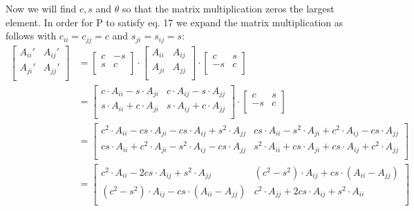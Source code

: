 \documentclass[12pt,twoside]{article}
\begin{document}
Now we will find $c, s$ and $\theta$ so that the matrix multiplication zeros the largest element. In order for P to satisfy eq. 17 we expand the matrix multiplication as follows with $c_{ii}=c_{jj}=c$ and $s_{ji}=s_{ij}=s$:\\
\begin{equation}
\begin{split}
\begin{bmatrix}
     A_{ii}' & A_{ij}' \\
    A_{ji}' & A_{jj}' \\
\end{bmatrix}
 &=
\begin{bmatrix}
     c & -s \\
    s & c \\
\end{bmatrix}
\cdot
\begin{bmatrix}
     A_{ii} & A_{ij} \\
    A_{ji} & A_{jj} \\
\end{bmatrix}
\cdot
\begin{bmatrix}
     c & s \\
     -s & c \\
\end{bmatrix}\\
&=\begin{bmatrix}
     c\cdot A_{ii} - s\cdot A_{ji} & c\cdot A_{ij} - s\cdot A_{jj} \\
     s\cdot A_{ii} + c\cdot A_{ji} & s\cdot A_{ij} + c\cdot A_{jj} \\
\end{bmatrix}
\cdot
\begin{bmatrix}
     c & s \\
     -s & c \\
\end{bmatrix}\\
&=\begin{bmatrix}
c^2\cdot A_{ii} - cs\cdot A_{ji} - cs\cdot A_{ij} + s^2\cdot A_{jj} & cs\cdot A_{ii} - s^2\cdot A_{ji} + c^2\cdot A_{ij} - cs\cdot A_{jj}\\
cs\cdot A_{ii} + c^2\cdot A_{ji} - s^2\cdot A_{ij} - cs\cdot A_{jj} & s^2\cdot A_{ii} + cs\cdot A_{ji} + cs\cdot A_{ij} + c^2\cdot A_{jj}\\
\end{bmatrix}\\
&=\begin{bmatrix}
c^2\cdot A_{ii} - 2cs\cdot A_{ij}  + s^2\cdot A_{jj} & (c^2-s^2)\cdot A_{ij}  + cs\cdot (A_{ii} - A_{jj})\\
(c^2-s^2)\cdot A_{ij}  - cs\cdot (A_{ii} - A_{jj}) & c^2\cdot A_{jj} + 2cs\cdot A_{ij} + s^2\cdot A_{ii}\\
\end{bmatrix}
\end{split}
\end{equation}
\end{document}
